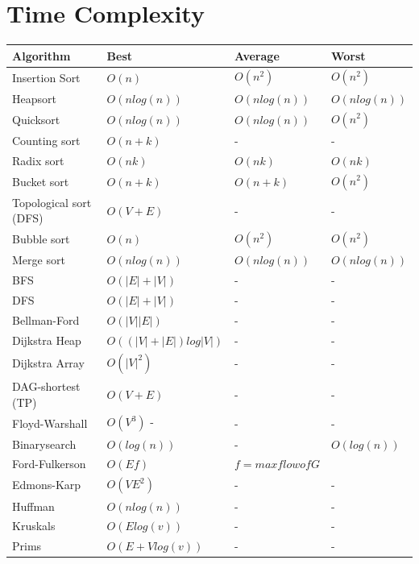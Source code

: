 \documentclass[a4paper, 10pt]{article}
\begin{document}
\section{Time Complexity}
\begin{tabular}{|l|l|l|l|}
	\hline
	Algorithm	            & Best & Average & Worst \\ \hline \hline \hline
	Insertion Sort          & $O(n)$ & $O(n^2)$ & $O(n^2)$ \\ \hline
	Heapsort                & $O(n log(n))$ & $O(n log(n))$ & $O(n log(n))$ \\ \hline
	Quicksort               & $O(n log(n))$ & $O(n log(n))$ & $O(n^2)$ \\ \hline
	Counting sort           & $O(n+k)$ & - & -  \\ \hline
	Radix sort              & $O(nk)$ & $O(nk)$ & $O(nk)$ \\ \hline
	Bucket sort             & $O(n+k)$ & $O(n+k)$ & $O(n^2)$ \\ \hline
	Topological sort (DFS)	& $O(V+E)$ & - & -  \\ \hline
	Bubble sort             & $O(n)$ & $O(n^2)$ & $O(n^2)$ \\ \hline
	Merge sort              & $O(n log(n))$ & $O(n log(n))$ & $O(n log(n))$ \\ \hline
	\hline
	BFS                     & $O(|E| + |V|)$ & - & - \\ \hline
	DFS                     & $O(|E| + |V|)$ & - & - \\ \hline
	Bellman-Ford            & $O(|V||E|)$ & - & - \\ \hline
	Dijkstra Heap           & $O((|V| + |E|) log |V|)$ & - & - \\ \hline
	Dijkstra Array          & $O(|V|^2)$ & - & - \\ \hline
	DAG-shortest (TP)       & $O(V+E)$ & - & -  \\ \hline
	Floyd-Warshall          & $O(V^3)$ - & - & - \\ \hline
	Binarysearch            & $O(log(n))$ & - & $O(log(n))$ \\ \hline
	\hline
	Ford-Fulkerson		    & $O(Ef)$ & $f = max flow of G$ & \\ \hline
	Edmons-Karp		        & $O(VE^2)$ & - & - \\ \hline
	\hline
	Huffman			        & $O(n log(n))$ & - & - \\ \hline
	\hline
	Kruskals			    & $O(E log(v))$ & - & - \\ \hline
	Prims			        & $O(E + V log(v))$ & - & - \\ \hline
	
\end{tabular}
\end{document}
